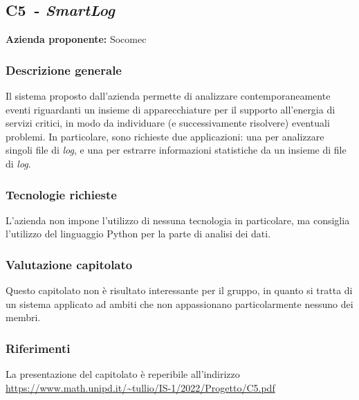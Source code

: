 
\renewcommand{\capName}{\textit{SmartLog}} %
\renewcommand{\capCode}{C5} %
\renewcommand{\capLink}{https://www.math.unipd.it/~tullio/IS-1/2022/Progetto/C5.pdf} %
\renewcommand{\capProposer}{Socomec} %


\subsection{\capCode\ - \capName}
\textbf{Azienda proponente:} Socomec
\subsubsection{Descrizione generale}
Il sistema proposto dall'azienda permette di analizzare contemporaneamente eventi riguardanti un insieme di apparecchiature per il supporto all'energia di servizi critici, in modo da individuare (e successivamente risolvere) eventuali problemi. In particolare, sono richieste due applicazioni: una per analizzare singoli file di \textit{log}, e una per estrarre informazioni statistiche da un insieme di file di \textit{log}.
\subsubsection{Tecnologie richieste}
L'azienda non impone l'utilizzo di nessuna tecnologia in particolare, ma consiglia l'utilizzo del linguaggio Python per la parte di analisi dei dati.
\subsubsection{Valutazione capitolato}
Questo capitolato non è risultato interessante per il gruppo, in quanto si tratta di un sistema applicato ad ambiti che non appassionano particolarmente nessuno dei membri.

\subsubsection{Riferimenti}
La presentazione del capitolato è reperibile all'indirizzo \url{\capLink} \hfill{}